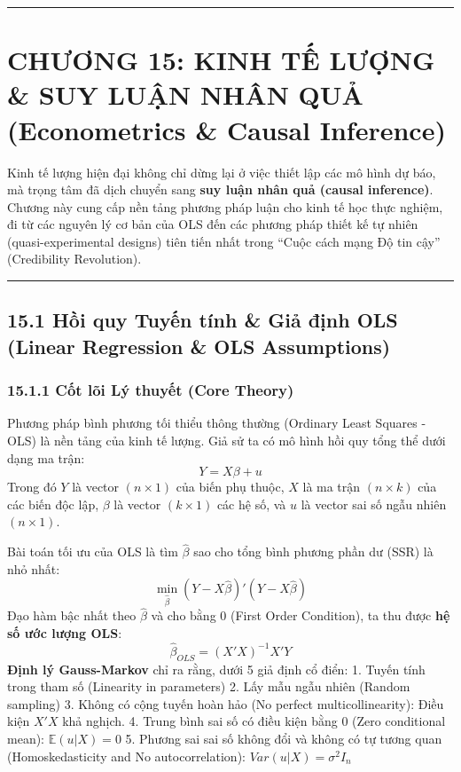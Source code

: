 \documentclass[
]{article}
\begin{document}
\begin{center}\rule{0.5\linewidth}{0.5pt}\end{center}

\section{CHƯƠNG 15: KINH TẾ LƯỢNG \& SUY LUẬN NHÂN QUẢ (Econometrics \&
Causal
Inference)}\label{chux1b0ux1a1ng-15-kinh-tux1ebf-lux1b0ux1ee3ng-suy-luux1eadn-nhuxe2n-quux1ea3-econometrics-causal-inference}

Kinh tế lượng hiện đại không chỉ dừng lại ở việc thiết lập các mô hình
dự báo, mà trọng tâm đã dịch chuyển sang \textbf{suy luận nhân quả
(causal inference)}. Chương này cung cấp nền tảng phương pháp luận cho
kinh tế học thực nghiệm, đi từ các nguyên lý cơ bản của OLS đến các
phương pháp thiết kế tự nhiên (quasi-experimental designs) tiên tiến
nhất trong ``Cuộc cách mạng Độ tin cậy'' (Credibility Revolution).

\begin{center}\rule{0.5\linewidth}{0.5pt}\end{center}

\subsection{15.1 Hồi quy Tuyến tính \& Giả định OLS (Linear Regression
\& OLS
Assumptions)}\label{hux1ed3i-quy-tuyux1ebfn-tuxednh-giux1ea3-ux111ux1ecbnh-ols-linear-regression-ols-assumptions}

\subsubsection{15.1.1 Cốt lõi Lý thuyết (Core
Theory)}\label{cux1ed1t-luxf5i-luxfd-thuyux1ebft-core-theory-46}

Phương pháp bình phương tối thiểu thông thường (Ordinary Least Squares -
OLS) là nền tảng của kinh tế lượng. Giả sử ta có mô hình hồi quy tổng
thể dưới dạng ma trận: \[ Y = X\beta + u \] Trong đó \(Y\) là vector
\((n \times 1)\) của biến phụ thuộc, \(X\) là ma trận \((n \times k)\)
của các biến độc lập, \(\beta\) là vector \((k \times 1)\) các hệ số, và
\(u\) là vector sai số ngẫu nhiên \((n \times 1)\).

Bài toán tối ưu của OLS là tìm \(\hat{\beta}\) sao cho tổng bình phương
phần dư (SSR) là nhỏ nhất:
\[ \min_{\hat{\beta}} (Y - X\hat{\beta})'(Y - X\hat{\beta}) \] Đạo hàm
bậc nhất theo \(\hat{\beta}\) và cho bằng 0 (First Order Condition), ta
thu được \textbf{hệ số ước lượng OLS}:
\[ \hat{\beta}_{OLS} = (X'X)^{-1}X'Y \] \textbf{Định lý Gauss-Markov}
chỉ ra rằng, dưới 5 giả định cổ điển: 1. Tuyến tính trong tham số
(Linearity in parameters) 2. Lấy mẫu ngẫu nhiên (Random sampling) 3.
Không có cộng tuyến hoàn hảo (No perfect multicollinearity): Điều kiện
\(X'X\) khả nghịch. 4. Trung bình sai số có điều kiện bằng 0 (Zero
conditional mean): \(\mathbb{E}(u|X) = 0\) 5. Phương sai sai số không
đổi và không có tự tương quan (Homoskedasticity and No autocorrelation):
\(Var(u|X) = \sigma^2 I_n\)
\end{document}
